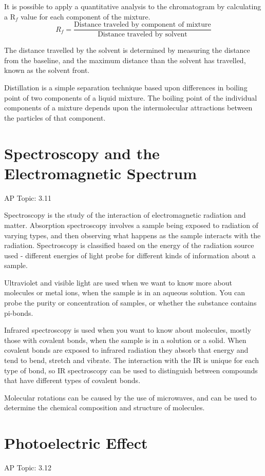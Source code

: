 \documentclass[../chem.tex]{subfiles}
\begin{document}
It is possible to apply a quantitative analysis to the chromatogram by calculating a R$_f$ value for each component of the mixture.
\[R_f=\frac{\text{Distance traveled by component of mixture}}{\text{Distance traveled by solvent}}\]

The distance travelled by the solvent is determined by measuring the distance from the baseline, and the maximum distance than the solvent has travelled, known as the solvent front.

Distillation is a simple separation technique based upon differences in boiling point of two components of a liquid mixture. The boiling point 
of the individual components of a mixture depends upon the intermolecular attractions between the particles of that component. 

\section{Spectroscopy and the Electromagnetic Spectrum}
AP Topic: 3.11

Spectroscopy is the study of the interaction of electromagnetic radiation and matter. Absorption spectroscopy involves a sample being exposed 
to radiation of varying types, and then observing what happens as the sample interacts with the radiation. Spectroscopy is classified based 
on the energy of the radiation source used - different energies of light probe for different kinds of information about a sample.

Ultraviolet and visible light are used when we want to know more about molecules or metal ions, when the sample is in an aqueous solution.
You can probe the purity or concentration of samples, or whether the substance contains pi-bonds.

Infrared spectroscopy is used when you want to know about molecules, mostly those with covalent bonds, when the sample is in a solution or a solid.
When covalent bonds are exposed to infrared radiation they absorb that energy and tend to bend, stretch and vibrate. The interaction with the IR 
is unique for each type of bond, so IR spectroscopy can be used to distinguish between compounds that have different types of covalent bonds.

Molecular rotations can be caused by the use of microwaves, and can be used to determine the chemical composition and structure of molecules.

\section{Photoelectric Effect}
AP Topic: 3.12
\end{document}
